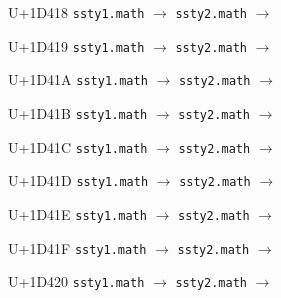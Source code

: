\documentclass{article}
\begin{document}
\begin{substitutions}
\goodbreak

U+1D418  \linebreak
    \texttt{ssty1.math} $\to$  \linebreak
    \texttt{ssty2.math} $\to$  

\goodbreak

U+1D419  \linebreak
    \texttt{ssty1.math} $\to$  \linebreak
    \texttt{ssty2.math} $\to$  

\goodbreak

U+1D41A  \linebreak
    \texttt{ssty1.math} $\to$  \linebreak
    \texttt{ssty2.math} $\to$  

\goodbreak

U+1D41B  \linebreak
    \texttt{ssty1.math} $\to$  \linebreak
    \texttt{ssty2.math} $\to$  

\goodbreak

U+1D41C  \linebreak
    \texttt{ssty1.math} $\to$  \linebreak
    \texttt{ssty2.math} $\to$  

\goodbreak

U+1D41D  \linebreak
    \texttt{ssty1.math} $\to$  \linebreak
    \texttt{ssty2.math} $\to$  

\goodbreak

U+1D41E  \linebreak
    \texttt{ssty1.math} $\to$  \linebreak
    \texttt{ssty2.math} $\to$  

\goodbreak

U+1D41F  \linebreak
    \texttt{ssty1.math} $\to$  \linebreak
    \texttt{ssty2.math} $\to$  

\goodbreak

U+1D420  \linebreak
    \texttt{ssty1.math} $\to$  \linebreak
    \texttt{ssty2.math} $\to$  


\end{substitutions}
\end{document}
